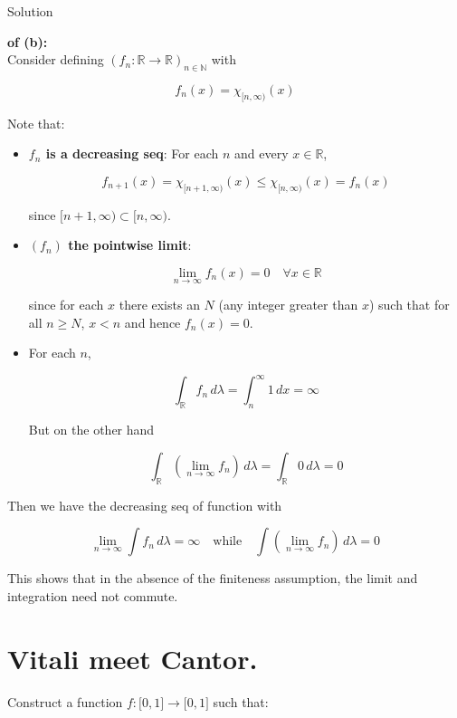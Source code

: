 \documentclass{qlnotes-export}
\begin{document}
\begin{qlsolution}{Solution}

\textbf{of (b):}\\
Consider defining \((f_{n}:{\mathbb{R}}\rightarrow{\mathbb{R}})_{n \in {\mathbb{N}}}\) with

\[f_{n}(x) = \chi_{\lbrack n,\infty)}(x)\]

Note that:

\begin{itemize}
\item
  \textbf{\(f_{n}\) is a decreasing seq}: For each \(n\) and every \(x \in {\mathbb{R}}\),

  \[f_{n + 1}(x) = \chi_{\lbrack n + 1,\infty)}(x) \leq \chi_{\lbrack n,\infty)}(x) = f_{n}(x)\]

  since \(\lbrack n + 1,\infty) \subset \lbrack n,\infty)\).
\item
  \textbf{\((f_{n})\) the pointwise limit}:

  \[\lim\limits_{n\rightarrow\infty}f_{n}(x) = 0\quad\forall x \in {\mathbb{R}}\]

  since for each \(x\) there exists an \(N\) (any integer greater than \(x\)) such that for all \(n \geq N\), \(x < n\) and hence \(f_{n}(x) = 0\).
\item
  For each \(n\),

  \[\int_{\mathbb{R}}f_{n}\, d\lambda = \int_{n}^{\infty}1\, dx = \infty\]

  But on the other hand

  \[\int_{\mathbb{R}}(\lim\limits_{n\rightarrow\infty}f_{n})\, d\lambda = \int_{\mathbb{R}}0\, d\lambda = 0\]
\end{itemize}

Then we have the decreasing seq of function with

\[\lim\limits_{n\rightarrow\infty}\int f_{n}\, d\lambda = \infty\quad\text{while}\quad\int(\lim\limits_{n\rightarrow\infty}f_{n})\, d\lambda = 0\]

This shows that in the absence of the finiteness assumption, the limit and integration need not commute.

\end{qlsolution}

\section{Vitali meet Cantor.}

Construct a function \(f:\lbrack 0,1\rbrack\rightarrow\lbrack 0,1\rbrack\) such that:
\end{document}
